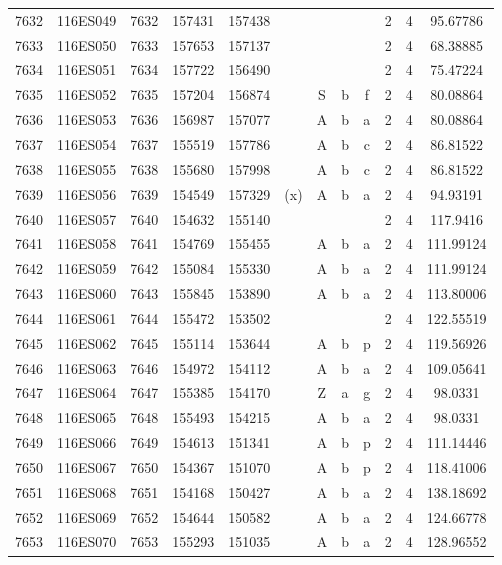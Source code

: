 \begin{tabular}{|*{12}{c|}}
7632 & 116ES049 & 7632 & 157431 & 157438 &  &  &  &  & 2 & 4 & 95.67786 \\ 
7633 & 116ES050 & 7633 & 157653 & 157137 &  &  &  &  & 2 & 4 & 68.38885 \\ 
7634 & 116ES051 & 7634 & 157722 & 156490 &  &  &  &  & 2 & 4 & 75.47224 \\ 
7635 & 116ES052 & 7635 & 157204 & 156874 &  & S & b & f & 2 & 4 & 80.08864 \\ 
7636 & 116ES053 & 7636 & 156987 & 157077 &  & A & b & a & 2 & 4 & 80.08864 \\ 
7637 & 116ES054 & 7637 & 155519 & 157786 &  & A & b & c & 2 & 4 & 86.81522 \\ 
7638 & 116ES055 & 7638 & 155680 & 157998 &  & A & b & c & 2 & 4 & 86.81522 \\ 
7639 & 116ES056 & 7639 & 154549 & 157329 & (x) & A & b & a & 2 & 4 & 94.93191 \\ 
7640 & 116ES057 & 7640 & 154632 & 155140 &  &  &  &  & 2 & 4 & 117.9416 \\ 
7641 & 116ES058 & 7641 & 154769 & 155455 &  & A & b & a & 2 & 4 & 111.99124 \\ 
7642 & 116ES059 & 7642 & 155084 & 155330 &  & A & b & a & 2 & 4 & 111.99124 \\ 
7643 & 116ES060 & 7643 & 155845 & 153890 &  & A & b & a & 2 & 4 & 113.80006 \\ 
7644 & 116ES061 & 7644 & 155472 & 153502 &  &  &  &  & 2 & 4 & 122.55519 \\ 
7645 & 116ES062 & 7645 & 155114 & 153644 &  & A & b & p & 2 & 4 & 119.56926 \\ 
7646 & 116ES063 & 7646 & 154972 & 154112 &  & A & b & a & 2 & 4 & 109.05641 \\ 
7647 & 116ES064 & 7647 & 155385 & 154170 &  & Z & a & g & 2 & 4 & 98.0331 \\ 
7648 & 116ES065 & 7648 & 155493 & 154215 &  & A & b & a & 2 & 4 & 98.0331 \\ 
7649 & 116ES066 & 7649 & 154613 & 151341 &  & A & b & p & 2 & 4 & 111.14446 \\ 
7650 & 116ES067 & 7650 & 154367 & 151070 &  & A & b & p & 2 & 4 & 118.41006 \\ 
7651 & 116ES068 & 7651 & 154168 & 150427 &  & A & b & a & 2 & 4 & 138.18692 \\ 
7652 & 116ES069 & 7652 & 154644 & 150582 &  & A & b & a & 2 & 4 & 124.66778 \\ 
7653 & 116ES070 & 7653 & 155293 & 151035 &  & A & b & a & 2 & 4 & 128.96552 \\ 

\end{tabular}
